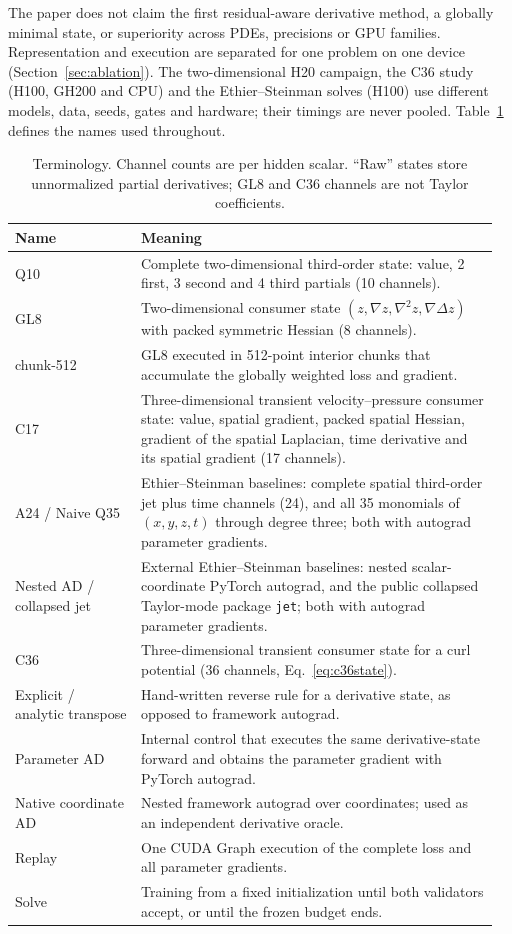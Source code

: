 \documentclass[11pt]{article}
\begin{document}
The paper does not claim the first residual-aware derivative method, a
globally minimal state, or superiority across PDEs, precisions or GPU
families. Representation and execution are separated for one problem on one
device (Section~\ref{sec:ablation}). The
two-dimensional H20 campaign, the C36 study (H100, GH200 and CPU) and the
Ethier--Steinman solves (H100) use different models, data, seeds, gates and
hardware; their timings are never pooled. Table~\ref{tab:terms} defines the names used throughout.

\begin{table}[t]
\centering\small
\caption{Terminology. Channel counts are per hidden scalar. ``Raw'' states store unnormalized partial derivatives; GL8 and C36 channels are not Taylor coefficients.}
\label{tab:terms}
\begin{tabular}{@{}p{0.25\linewidth}p{0.71\linewidth}@{}}\toprule
Name & Meaning\\\midrule
Q10 & Complete two-dimensional third-order state: value, 2 first, 3 second and 4 third partials (10 channels).\\
GL8 & Two-dimensional consumer state $(z,\nabla z,\nabla^2 z,\nabla\Delta z)$ with packed symmetric Hessian (8 channels).\\
chunk-512 & GL8 executed in 512-point interior chunks that accumulate the globally weighted loss and gradient.\\
C17 & Three-dimensional transient velocity--pressure consumer state: value, spatial gradient, packed spatial Hessian, gradient of the spatial Laplacian, time derivative and its spatial gradient (17 channels).\\
A24 / Naive Q35 & Ethier--Steinman baselines: complete spatial third-order jet plus time channels (24), and all 35 monomials of $(x,y,z,t)$ through degree three; both with autograd parameter gradients.\\
Nested AD / collapsed jet & External Ethier--Steinman baselines: nested scalar-coordinate PyTorch autograd, and the public collapsed Taylor-mode package \texttt{jet}; both with autograd parameter gradients.\\
C36 & Three-dimensional transient consumer state for a curl potential (36 channels, Eq.~\eqref{eq:c36state}).\\
Explicit / analytic transpose & Hand-written reverse rule for a derivative state, as opposed to framework autograd.\\
Parameter AD & Internal control that executes the same derivative-state forward and obtains the parameter gradient with PyTorch autograd.\\
Native coordinate AD & Nested framework autograd over coordinates; used as an independent derivative oracle.\\
Replay & One CUDA Graph execution of the complete loss and all parameter gradients.\\
Solve & Training from a fixed initialization until both validators accept, or until the frozen budget ends.\\
\bottomrule\end{tabular}
\end{table}
\end{document}
